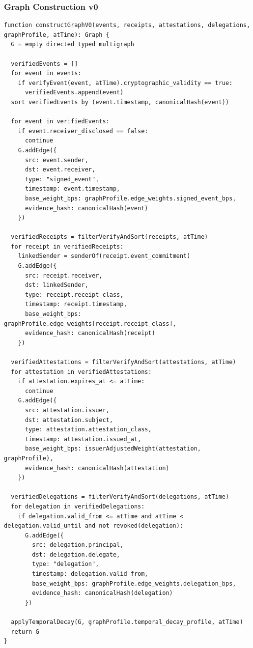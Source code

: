 \documentclass[11pt]{article}
\begin{document}
\subsubsection{Graph Construction v0}

\begin{lstlisting}[style=tslcode]
function constructGraphV0(events, receipts, attestations, delegations, graphProfile, atTime): Graph {
  G = empty directed typed multigraph

  verifiedEvents = []
  for event in events:
    if verifyEvent(event, atTime).cryptographic_validity == true:
      verifiedEvents.append(event)
  sort verifiedEvents by (event.timestamp, canonicalHash(event))

  for event in verifiedEvents:
    if event.receiver_disclosed == false:
      continue
    G.addEdge({
      src: event.sender,
      dst: event.receiver,
      type: "signed_event",
      timestamp: event.timestamp,
      base_weight_bps: graphProfile.edge_weights.signed_event_bps,
      evidence_hash: canonicalHash(event)
    })

  verifiedReceipts = filterVerifyAndSort(receipts, atTime)
  for receipt in verifiedReceipts:
    linkedSender = senderOf(receipt.event_commitment)
    G.addEdge({
      src: receipt.receiver,
      dst: linkedSender,
      type: receipt.receipt_class,
      timestamp: receipt.timestamp,
      base_weight_bps: graphProfile.edge_weights[receipt.receipt_class],
      evidence_hash: canonicalHash(receipt)
    })

  verifiedAttestations = filterVerifyAndSort(attestations, atTime)
  for attestation in verifiedAttestations:
    if attestation.expires_at <= atTime:
      continue
    G.addEdge({
      src: attestation.issuer,
      dst: attestation.subject,
      type: attestation.attestation_class,
      timestamp: attestation.issued_at,
      base_weight_bps: issuerAdjustedWeight(attestation, graphProfile),
      evidence_hash: canonicalHash(attestation)
    })

  verifiedDelegations = filterVerifyAndSort(delegations, atTime)
  for delegation in verifiedDelegations:
    if delegation.valid_from <= atTime and atTime < delegation.valid_until and not revoked(delegation):
      G.addEdge({
        src: delegation.principal,
        dst: delegation.delegate,
        type: "delegation",
        timestamp: delegation.valid_from,
        base_weight_bps: graphProfile.edge_weights.delegation_bps,
        evidence_hash: canonicalHash(delegation)
      })

  applyTemporalDecay(G, graphProfile.temporal_decay_profile, atTime)
  return G
}
\end{lstlisting}
\end{document}
